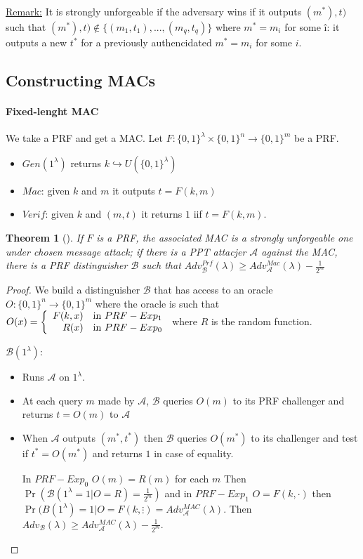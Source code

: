 \documentclass{article}
\newtheorem{thm}{Theorem}[section]
\newcommand{\Thm}[3]{\begin{thm}[#1]\label{#2}#3\end{thm}}
\newcommand{\Rem}{\underline{Remark:} }
\newcommand{\A}{\mathcal{A}}
\newcommand{\B}{\mathcal{B}}
\newcommand{\bit}{\{0,1\}}
\begin{document}
\Rem It is strongly unforgeable if the adversary wins if it outputs $(m^*),t)$ such that $(m^*),t)\notin\{(m_1,t_1),...,(m_q,t_q)\}$ where $m^*=m_i$ for some î: it outputs a new $t^*$ for a previously authencidated $m^*=m_i$ for some $i$.

\subsection{Constructing MACs}
\paragraph{Fixed-lenght MAC} We take a PRF and get a MAC. Let $F:\bit^\lambda\times\bit^n\rightarrow\bit^m$ be a PRF.\begin{itemize}
\item $Gen(1^\lambda)$ returns $k\hookrightarrow U(\bit^\lambda)$
\item $Mac$: given $k$ and $m$ it outputs $t=F(k,m)$
\item $Verif$: given $k$ and $(m,t)$ it returns $1$ iif $t=F(k,m)$.
\end{itemize}

\Thm{}{thm:cstrongunforgeMacbyPRF}{If $F$ is a PRF, the associated MAC is a strongly unforgeable one under chosen message attack; if there is a PPT attacjer $\A$ against the MAC, there is a PRF distinguisher $\B$ such that $Adv_\B^{Prf}(\lambda)\geq Adv_\A^{Mac}(\lambda)-\frac{1}{2^m}$}

\begin{proof}
We build a distinguisher $\B$ that has access to an oracle $O:\bit^n\rightarrow\bit^m$ where the oracle is such that $O(x)=\left\{\begin{array}{r l}
F(k,x) & \text{in $PRF-Exp_1$}\\
R(x) & \text{in $PRF-Exp_0$}
\end{array}\right.$ where $R$ is the random function.

$\B(1^\lambda)$:\begin{itemize}
\item Runs $\A$ on $1^\lambda$.
\item At each query $m$ made by $\A$, $\B$ queries $O(m)$ to its PRF challenger and returns $t=O(m)$ to $\A$
\item When $\A$ outputs $(m^*,t^*)$ then $\B$ queries $O(m^*)$ to its challenger and test if $t^*=O(m^*)$ and returns $1$ in case of equality.

In $PRF-Exp_0$ $O(m)=R(m)$ for each $m$ Then $\Pr(\B(1^\lambda=1|O=R)=\frac{1}{2^m})$ and in $PRF-Exp_1$ $O=F(k,\cdot)$ then $\Pr(B(1^\lambda)=1|O=F(k,\vdots) = Adv_\A^{MAC}(\lambda)$. Then $Adv_\B(\lambda)\geq Adv_\A^{MAC}(\lambda) - \frac{1}{2^m}$.
\end{itemize}
\end{proof}
\end{document}
